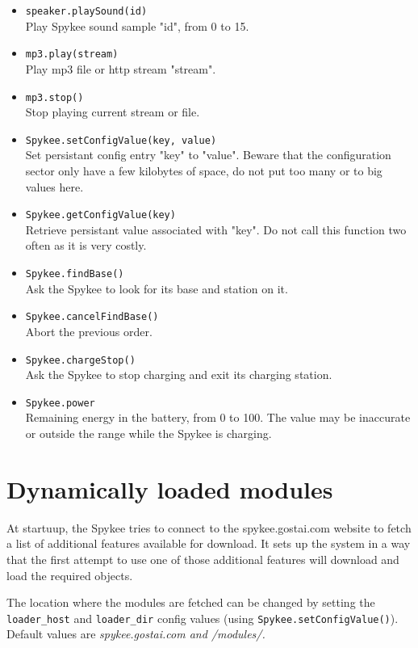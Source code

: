 \begin{itemize}
\item \lstinline|speaker.playSound(id)| \\
    Play Spykee sound sample "id", from 0 to 15.
\item \lstinline|mp3.play(stream)| \\
    Play mp3 file or http stream "stream".
\item \lstinline|mp3.stop()| \\
    Stop playing current stream or file.
\item \lstinline|Spykee.setConfigValue(key, value)| \\
    Set persistant config entry "key" to "value". Beware that the configuration
    sector only have a few kilobytes of space, do not put too many or to big
    values here.
\item \lstinline|Spykee.getConfigValue(key)| \\
    Retrieve persistant value associated with "key". Do not call this function
    two often as it is very costly.
\item \lstinline|Spykee.findBase()| \\
    Ask the Spykee to look for its base and station on it.
\item \lstinline|Spykee.cancelFindBase()| \\
    Abort the previous order.
\item \lstinline|Spykee.chargeStop()| \\
    Ask the Spykee to stop charging and exit its charging station.
\item \lstinline|Spykee.power| \\
    Remaining energy in the battery, from 0 to 100. The value may be inaccurate
    or outside the range while the Spykee is charging.
\end{itemize}

\section{Dynamically loaded modules}
At startuup, the Spykee tries to connect to the spykee.gostai.com website to
fetch a list of additional features available for download.
It sets up the system in a way that the first attempt to use one of those
additional features will download and load the required objects.

The location where the modules are fetched can be changed by setting the
\lstinline|loader_host| and \lstinline|loader_dir| config values (using
\lstinline|Spykee.setConfigValue()|).
Default values are \em{spykee.gostai.com} and \em{/modules/}.


